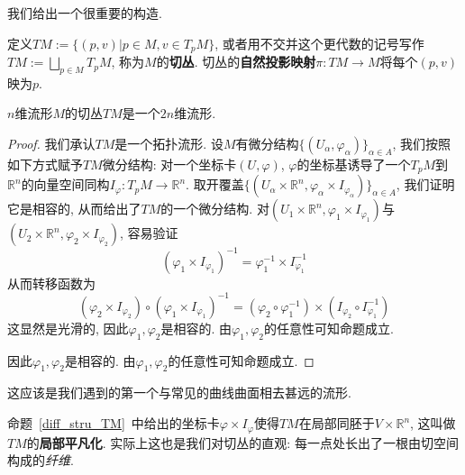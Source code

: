 我们给出一个很重要的构造.

\begin{defn}
    定义$TM:=\{(p,v)|p\in M,v\in T_pM\}$, 或者用不交并这个更代数的记号写作$\displaystyle TM:=\bigsqcup_{p\in M}T_pM$, 称为$M$的\textbf{切丛}.
    切丛的\textbf{自然投影映射}$\pi:TM\to M$将每个$(p,v)$映为$p$.
\end{defn}

\begin{prop}\label{diff_stru_TM}
    $n$维流形$M$的切丛$TM$是一个$2n$维流形.
\end{prop}
\begin{proof}
    我们承认$TM$是一个拓扑流形.
    设$M$有微分结构$\{(U_\alpha,\varphi_\alpha)\}_{\alpha\in A}$, 我们按照如下方式赋予$TM$微分结构:
    对一个坐标卡$(U,\varphi)$, $\varphi$的坐标基诱导了一个$T_pM$到$\mathbb{R}^n$的向量空间同构$I_\varphi:T_pM\to\mathbb{R}^n$.
    取开覆盖$\{(U_\alpha\times\mathbb{R}^n,\varphi_\alpha\times I_{\varphi_\alpha})\}_{\alpha\in A}$, 我们证明它是相容的, 从而给出了$TM$的一个微分结构.
    对$(U_1\times\mathbb{R}^n,\varphi_1\times I_{\varphi_1})$与$(U_2\times\mathbb{R}^n,\varphi_2\times I_{\varphi_2})$, 容易验证
    \[(\varphi_1\times I_{\varphi_1})^{-1}=\varphi_1^{-1}\times I_{\varphi_1}^{-1}\]
    从而转移函数为
    \[(\varphi_2\times I_{\varphi_2})\circ(\varphi_1\times I_{\varphi_1})^{-1}=(\varphi_2\circ\varphi_1^{-1})\times(I_{\varphi_2}\circ I_{\varphi_1}^{-1})\]
    这显然是光滑的, 因此$\varphi_1,\varphi_2$是相容的.
    由$\varphi_1,\varphi_2$的任意性可知命题成立.
    
    因此$\varphi_1,\varphi_2$是相容的.
    由$\varphi_1,\varphi_2$的任意性可知命题成立.
\end{proof}

这应该是我们遇到的第一个与常见的曲线曲面相去甚远的流形.

\begin{rem}
    命题~\ref{diff_stru_TM}~中给出的坐标卡$\varphi\times I_\varphi$使得$TM$在局部同胚于$V\times\mathbb{R}^n$, 这叫做$TM$的\textbf{局部平凡化}.
    实际上这也是我们对切丛的直观: 每一点处长出了一根由切空间构成的\textit{纤维}.
\end{rem}

